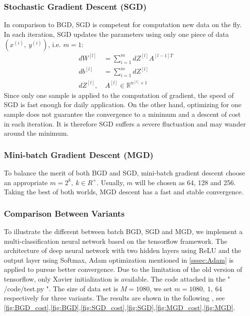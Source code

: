 \subsubsection{Stochastic Gradient Descent (SGD)}
In comparison to BGD, SGD is competent for computation
new data on the fly. In each iteration, SGD updates the parameters using
only one piece of data $ (x^{(i)},\ y^{(i)}) $, i.e. $ m = 1 $:
\begin{equation}
    \begin{split}
        dW^{[l]} & = \sum\limits_{i=1}^mdZ^{[l]}A^{[l-1]T} \\
        db^{[l]} & = \sum\limits_{i=1}^mdZ^{[l]} \\
        dZ^{[l]},&\ A^{[l]} \in \mathbb{R}^{n^{[l]}\times 1}
    \end{split}
\end{equation} 
Since only one sample is applied to the computation of gradient, the speed
of SGD is fast enough for daily application. On the other hand, optimizing
for one sample does not guarantee the convergence to a minimum and a descent
of cost in each iteration. It is therefore SGD suffers a severe fluctuation
and may wander around the minimum.

\subsubsection{Mini-batch Gradient Descent (MGD)}
\label{sssec:MiniBatch}
To balance the merit of both BGD and SGD, mini-batch gradient descent
choose an appropriate $ m = 2^k,\ k\in R^+ $. Usually, $ m $ will be chosen
as 64, 128 and 256. Taking the best of both worlds, MGD
descent has a fast and stable convergence.


\subsubsection{Comparison Between Variants}
To illustrate the different between batch BGD, SGD and MGD, we 
implement a multi-classification neural network based on the tensorflow 
framework. The architecture 
of deep neural network with two hidden layers using ReLU and the output 
layer using Softmax, Adam optimization mentioned in \autoref{sssec:Adam} 
is applied to pursue better convergence. Due to the limitation of the 
old version of tensorflow, only Xavier initialization is available.
The code attached in the " /code/test.py ".
The size of data set is $ M = 1080 $, we set $ m = 1080,\ 1,\ 
64 $ respectively for three variants. The results are shown in the following
, see \autoref{fig:BGD_cost},\autoref{fig:BGD},\autoref{fig:SGD_cost},\autoref{fig:SGD},\autoref{fig:MGD_cost},\autoref{fig:MGD}.

